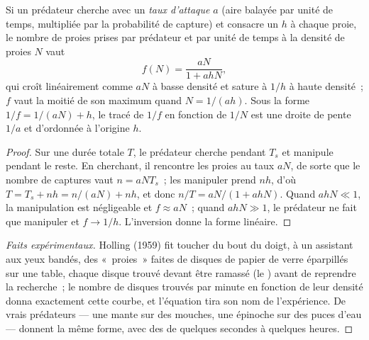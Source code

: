 \begin{theorem}\label{thm:b1:species-interactions:holling}
Si un prédateur cherche avec un \emph{taux d'attaque} $a$ (aire
balayée par unité de temps, multipliée par la probabilité de capture)
et consacre un  $h$ à chaque proie, le nombre de
proies prises par prédateur et par unité de temps à la densité de
proies $N$ vaut
\[
f(N) = \frac{aN}{1 + ahN} ,
\]
qui croît linéairement comme $aN$ à basse densité et sature à $1/h$ à
haute densité~; $f$ vaut la moitié de son maximum quand $N = 1/(ah)$.
Sous la forme
$1/f = 1/(aN) + h$, le tracé de $1/f$ en fonction de $1/N$ est une
droite de pente $1/a$ et d'ordonnée à l'origine $h$.
\end{theorem}
\begin{proof}
Sur une durée totale $T$, le prédateur cherche pendant $T_s$ et
manipule pendant le reste. En cherchant, il rencontre les proies au
taux $aN$, de sorte que le nombre de captures vaut
$n = aN T_s$~; les manipuler prend $nh$, d'où $T = T_s + nh =
n/(aN) + nh$, et donc $n/T = aN/(1 + ahN)$. Quand $ahN \ll 1$, la
manipulation est négligeable et $f \approx aN$~; quand $ahN \gg 1$, le
prédateur ne fait que manipuler et $f \to 1/h$. L'inversion donne la
forme linéaire.
\end{proof}
\begin{proof}[Faits expérimentaux]
Holling (1959) fit toucher du bout du doigt, à un assistant aux yeux
bandés, des «~proies~» faites de disques de papier de verre éparpillés
sur une table, chaque disque trouvé devant être ramassé (le ) avant de reprendre la recherche~; le nombre de disques
trouvés par minute en fonction de leur densité donna exactement cette
courbe, et l'équation tira son nom de l'expérience. De vrais
prédateurs --- une mante sur des mouches, une épinoche sur des puces
d'eau --- donnent la même forme, avec des  de
quelques secondes à quelques heures.
\end{proof}

